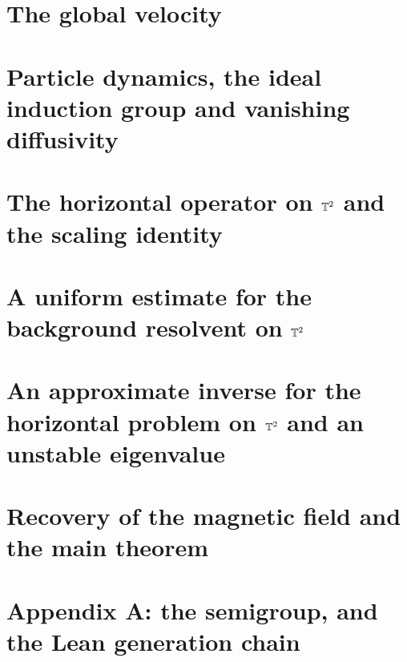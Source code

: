 \chapter{The global velocity}


\chapter{Particle dynamics, the ideal induction group and vanishing diffusivity}


\chapter{The horizontal operator on $\mathbb{T}^2$ and the scaling identity}


\chapter{A uniform estimate for the background resolvent on $\mathbb{T}^2$}


\chapter{An approximate inverse for the horizontal problem on $\mathbb{T}^2$ and an unstable eigenvalue}


\chapter{Recovery of the magnetic field and the main theorem}


\chapter{Appendix A: the semigroup, and the Lean generation chain}

